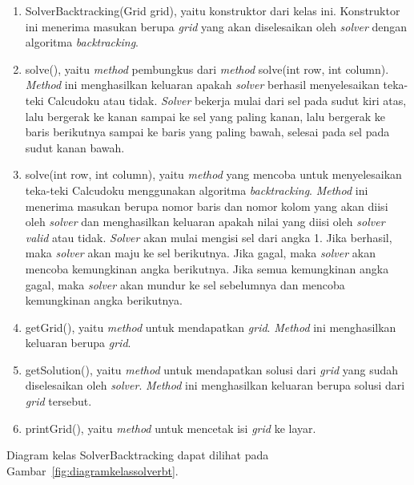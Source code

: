 \begin{enumerate}
\item SolverBacktracking(Grid grid), yaitu konstruktor dari kelas ini. Konstruktor ini menerima masukan berupa \textit{grid} yang akan diselesaikan oleh \textit{solver} dengan algoritma \textit{backtracking}.
\item solve(), yaitu \textit{method} pembungkus dari \textit{method} solve(int row, int column). \textit{Method} ini menghasilkan keluaran apakah \textit{solver} berhasil menyelesaikan teka-teki Calcudoku atau tidak. \textit{Solver} bekerja mulai dari sel pada sudut kiri atas, lalu bergerak ke kanan sampai ke sel yang paling kanan, lalu bergerak ke baris berikutnya sampai ke baris yang paling bawah, selesai pada sel pada sudut kanan bawah.
\item solve(int row, int column), yaitu \textit{method} yang mencoba untuk menyelesaikan teka-teki Calcudoku menggunakan algoritma \textit{backtracking}. \textit{Method} ini menerima masukan berupa nomor baris dan nomor kolom yang akan diisi oleh \textit{solver} dan menghasilkan keluaran apakah nilai yang diisi oleh \textit{solver valid} atau tidak. \textit{Solver} akan mulai mengisi sel dari angka 1. Jika berhasil, maka \textit{solver} akan maju ke sel berikutnya. Jika gagal, maka \textit{solver} akan mencoba kemungkinan angka berikutnya. Jika semua kemungkinan angka gagal, maka \textit{solver} akan mundur ke sel sebelumnya dan mencoba kemungkinan angka berikutnya.
\item getGrid(), yaitu \textit{method} untuk mendapatkan \textit{grid}. \textit{Method} ini menghasilkan keluaran berupa \textit{grid}.
\item getSolution(), yaitu \textit{method} untuk mendapatkan solusi dari \textit{grid} yang sudah diselesaikan oleh \textit{solver}. \textit{Method} ini menghasilkan keluaran berupa solusi dari \textit{grid} tersebut.
\item printGrid(), yaitu \textit{method} untuk mencetak isi \textit{grid} ke layar.
\end{enumerate}

Diagram kelas SolverBacktracking dapat dilihat pada Gambar~\ref{fig:diagramkelassolverbt}.

